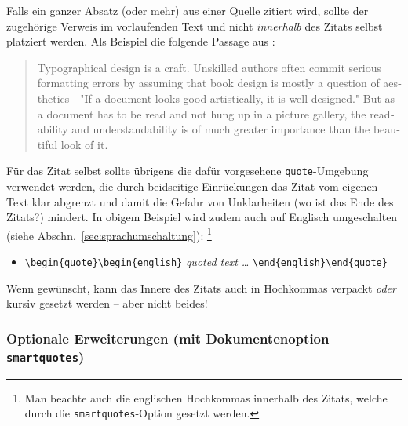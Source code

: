 Falls ein ganzer Absatz (oder mehr) aus einer Quelle zitiert wird, sollte der
zugehörige Verweis im vorlaufenden Text und nicht \emph{innerhalb} des Zitats selbst
platziert werden. Als Beispiel die folgende Passage aus \cite{Oetiker2021}:
%
\begin{quote}
    \begin{english}
        Typographical design is a craft. Unskilled authors often
        commit serious formatting errors by assuming that book
        design is mostly a question of aesthetics---"If a document
        looks good artistically, it is well designed." But as a
        document has to be read and not hung up in a picture
        gallery, the readability and understandability is of much
        greater importance than the beautiful look of it.
    \end{english}
\end{quote}
%
Für das Zitat selbst sollte übrigens die dafür vorgesehene
\texttt{quote}-Umgebung verwendet werden, die durch beidseitige Einrückungen
das Zitat vom eigenen Text klar abgrenzt und damit die Gefahr von
Unklarheiten (wo ist das Ende des Zitats?) mindert. In obigem Beispiel wird
zudem auch auf Englisch umgeschalten (siehe Abschn.\
\ref{sec:sprachumschaltung}):%
\footnote{Man beachte auch die englischen Hochkommas innerhalb
des Zitats, welche durch die \texttt{smartquotes}-Option gesetzt werden.}
%
\begin{itemize}
    \item[] \verb!\begin{quote}\begin{english}! \emph{quoted text \ldots}
    \verb!\end{english}\end{quote}!
\end{itemize}
%
Wenn gewünscht, kann das Innere des Zitats auch in Hochkommas verpackt
\emph{oder} kursiv gesetzt werden -- aber nicht beides!


\subsubsection{Optionale Erweiterungen (mit Dokumentenoption
\texttt{smartquotes})}

